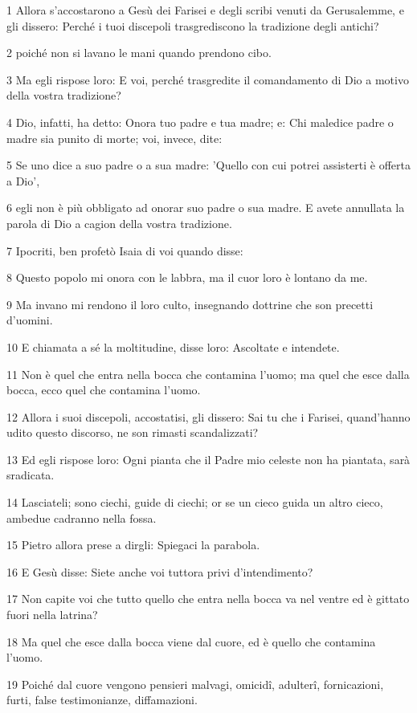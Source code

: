 \par 1 Allora s'accostarono a Gesù dei Farisei e degli scribi venuti da Gerusalemme, e gli dissero: Perché i tuoi discepoli trasgrediscono la tradizione degli antichi?
\par 2 poiché non si lavano le mani quando prendono cibo.
\par 3 Ma egli rispose loro: E voi, perché trasgredite il comandamento di Dio a motivo della vostra tradizione?
\par 4 Dio, infatti, ha detto: Onora tuo padre e tua madre; e: Chi maledice padre o madre sia punito di morte; voi, invece, dite:
\par 5 Se uno dice a suo padre o a sua madre: 'Quello con cui potrei assisterti è offerta a Dio',
\par 6 egli non è più obbligato ad onorar suo padre o sua madre. E avete annullata la parola di Dio a cagion della vostra tradizione.
\par 7 Ipocriti, ben profetò Isaia di voi quando disse:
\par 8 Questo popolo mi onora con le labbra, ma il cuor loro è lontano da me.
\par 9 Ma invano mi rendono il loro culto, insegnando dottrine che son precetti d'uomini.
\par 10 E chiamata a sé la moltitudine, disse loro: Ascoltate e intendete.
\par 11 Non è quel che entra nella bocca che contamina l'uomo; ma quel che esce dalla bocca, ecco quel che contamina l'uomo.
\par 12 Allora i suoi discepoli, accostatisi, gli dissero: Sai tu che i Farisei, quand'hanno udito questo discorso, ne son rimasti scandalizzati?
\par 13 Ed egli rispose loro: Ogni pianta che il Padre mio celeste non ha piantata, sarà sradicata.
\par 14 Lasciateli; sono ciechi, guide di ciechi; or se un cieco guida un altro cieco, ambedue cadranno nella fossa.
\par 15 Pietro allora prese a dirgli: Spiegaci la parabola.
\par 16 E Gesù disse: Siete anche voi tuttora privi d'intendimento?
\par 17 Non capite voi che tutto quello che entra nella bocca va nel ventre ed è gittato fuori nella latrina?
\par 18 Ma quel che esce dalla bocca viene dal cuore, ed è quello che contamina l'uomo.
\par 19 Poiché dal cuore vengono pensieri malvagi, omicidî, adulterî, fornicazioni, furti, false testimonianze, diffamazioni.
